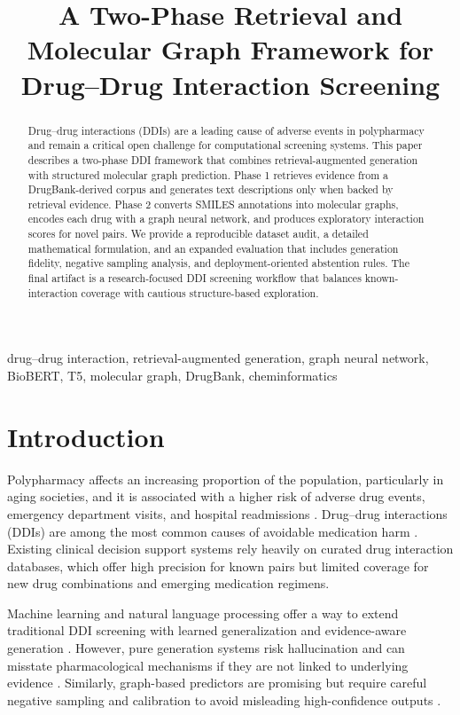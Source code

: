 \documentclass[conference]{IEEEtran}
\title{A Two-Phase Retrieval and Molecular Graph Framework for Drug--Drug Interaction Screening}
\author{%
    \IEEEauthorblockN{Author Name(s) Omitted for Review}
    \IEEEauthorblockA{Department/Institution Omitted for Review\\
    \texttt{email@example.com}}
}
\begin{document}
\maketitle

\begin{abstract}
Drug--drug interactions (DDIs) are a leading cause of adverse events in polypharmacy and remain a critical open challenge for computational screening systems. This paper describes a two-phase DDI framework that combines retrieval-augmented generation with structured molecular graph prediction. Phase 1 retrieves evidence from a DrugBank-derived corpus and generates text descriptions only when backed by retrieval evidence. Phase 2 converts SMILES annotations into molecular graphs, encodes each drug with a graph neural network, and produces exploratory interaction scores for novel pairs. We provide a reproducible dataset audit, a detailed mathematical formulation, and an expanded evaluation that includes generation fidelity, negative sampling analysis, and deployment-oriented abstention rules. The final artifact is a research-focused DDI screening workflow that balances known-interaction coverage with cautious structure-based exploration.
\end{abstract}

\begin{IEEEkeywords}
drug--drug interaction, retrieval-augmented generation, graph neural network, BioBERT, T5, molecular graph, DrugBank, cheminformatics
\end{IEEEkeywords}

\section{Introduction}
Polypharmacy affects an increasing proportion of the population, particularly in aging societies, and it is associated with a higher risk of adverse drug events, emergency department visits, and hospital readmissions \cite{hoppe2019polypharmacy, laroche2014polypharmacy}. Drug--drug interactions (DDIs) are among the most common causes of avoidable medication harm \cite{johnson2015drug}. Existing clinical decision support systems rely heavily on curated drug interaction databases, which offer high precision for known pairs but limited coverage for new drug combinations and emerging medication regimens.

Machine learning and natural language processing offer a way to extend traditional DDI screening with learned generalization and evidence-aware generation \cite{wu2021survey, zitnik2018decagon}. However, pure generation systems risk hallucination and can misstate pharmacological mechanisms if they are not linked to underlying evidence \cite{ji2023survey}. Similarly, graph-based predictors are promising but require careful negative sampling and calibration to avoid misleading high-confidence outputs \cite{hendrycks2019benchmarking}.
\end{document}
